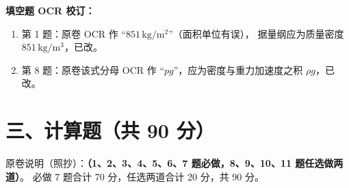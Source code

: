 \begin{tishi}
\textbf{填空题 OCR 校订：}
\begin{enumerate}
  \item 第 1 题：原卷 OCR 作 ``$851\,\mathrm{kg/m^2}$''（面积单位有误），
    据量纲应为质量密度 $851\,\mathrm{kg/m^3}$，已改。
  \item 第 8 题：原卷该式分母 OCR 作 ``$pg$''，应为密度与重力加速度之积 $\rho g$，已改。
\end{enumerate}
\end{tishi}

\section{三、计算题（共 90 分）}

\begin{tishi}
原卷说明（照抄）：\textbf{（1、2、3、4、5、6、7 题必做，8、9、10、11 题任选做两道）}。
必做 7 题合计 70 分，任选两道合计 20 分，共 90 分。
\end{tishi}

